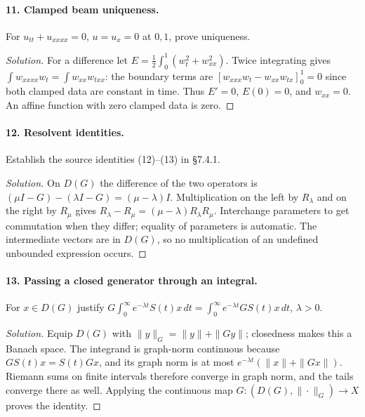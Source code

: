 \Needspace{30mm}
\paragraph{11. Clamped beam uniqueness.}
For $u_{tt}+u_{xxxx}=0$, $u=u_x=0$ at $0,1$, prove uniqueness.
\begin{proof}[Solution]
For a difference let $E=\frac12\int_0^1(w_t^2+w_{xx}^2)$.
Twice integrating gives
$\int w_{xxxx}w_t=\int w_{xx}w_{txx}$: the boundary terms are
$[w_{xxx}w_t-w_{xx}w_{tx}]_0^1=0$ since both clamped data are constant
in time. Thus $E'=0$, $E(0)=0$, and $w_{xx}=0$.
An affine function with zero clamped data is zero.
\end{proof}

\Needspace{30mm}
\paragraph{12. Resolvent identities.}
Establish the source identities (12)--(13) in \S7.4.1.
\begin{proof}[Solution]
On $D(G)$ the difference of the two operators is
$(\mu I-G)-(\lambda I-G)=(\mu-\lambda)I$.
Multiplication on the left by $R_\lambda$ and on the right by $R_\mu$
gives $R_\lambda-R_\mu=(\mu-\lambda)R_\lambda R_\mu$.
Interchange parameters to get commutation when they differ; equality
of parameters is automatic. The intermediate vectors are in $D(G)$,
so no multiplication of an undefined unbounded expression occurs.
\end{proof}

\Needspace{30mm}
\paragraph{13. Passing a closed generator through an integral.}
For $x\in D(G)$ justify
$G\int_0^\infty e^{-\lambda t}S(t)x\,dt
=\int_0^\infty e^{-\lambda t}GS(t)x\,dt$, $\lambda>0$.
\begin{proof}[Solution]
Equip $D(G)$ with $\|y\|_G=\|y\|+\|Gy\|$; closedness makes this a Banach
space. The integrand is graph-norm continuous because
$GS(t)x=S(t)Gx$, and its graph norm is at most
$e^{-\lambda t}(\|x\|+\|Gx\|)$.
Riemann sums on finite intervals therefore converge in graph norm, and
the tails converge there as well. Applying the continuous map
$G:(D(G),\|\cdot\|_G)\to X$ proves the identity.
\end{proof}
\Needspace{55mm}

